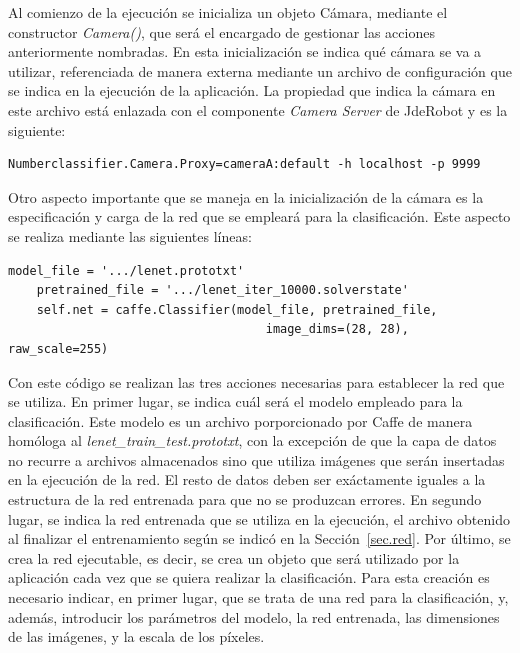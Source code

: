Al comienzo de la ejecución se inicializa un objeto Cámara, mediante el constructor \textit{Camera()}, que será el encargado de gestionar las acciones anteriormente nombradas. En esta inicialización se indica qué cámara se va a utilizar, referenciada de manera externa mediante un archivo de configuración que se indica en la ejecución de la aplicación. La propiedad que indica la cámara en este archivo está enlazada con el componente \textit{Camera Server} de JdeRobot y es la siguiente:
\vspace{10pt}
\begin{lstlisting}[frame=single]
	Numberclassifier.Camera.Proxy=cameraA:default -h localhost -p 9999
\end{lstlisting}

Otro aspecto importante que se maneja en la inicialización de la cámara es la especificación y carga de la red que se empleará para la clasificación. Este aspecto se realiza mediante las siguientes líneas:
\vspace{10pt}
\begin{lstlisting}[frame=single]
	model_file = '.../lenet.prototxt'
	pretrained_file = '.../lenet_iter_10000.solverstate'
	self.net = caffe.Classifier(model_file, pretrained_file, 
									image_dims=(28, 28), raw_scale=255)
\end{lstlisting}

Con este código se realizan las tres acciones necesarias para establecer la red que se utiliza. En primer lugar, se indica cuál será el modelo empleado para la clasificación. Este modelo es un archivo porporcionado por Caffe de manera homóloga al \textit{lenet\_train\_test.prototxt}, con la excepción de que la capa de datos no recurre a archivos almacenados sino que utiliza imágenes que serán insertadas en la ejecución de la red. El resto de datos deben ser exáctamente iguales a la estructura de la red entrenada para que no se produzcan errores. En segundo lugar, se indica la red entrenada que se utiliza en la ejecución, el archivo obtenido al finalizar el entrenamiento según se indicó en la Sección~\ref{sec.red}. Por último, se crea la red ejecutable, es decir, se crea un objeto que será utilizado por la aplicación cada vez que se quiera realizar la clasificación. Para esta creación es necesario indicar, en primer lugar, que se trata de una red para la clasificación, y, además, introducir los parámetros del modelo, la red entrenada, las dimensiones de las imágenes, y la escala de los píxeles.\\

